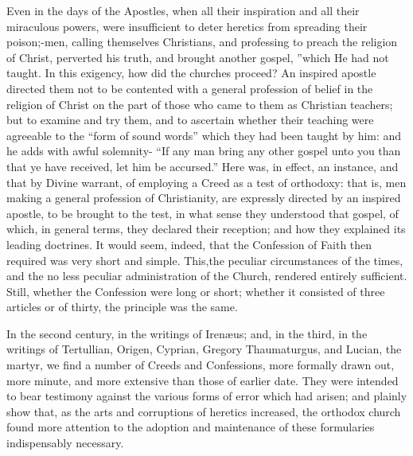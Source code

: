 \documentclass[
]{book}
\begin{document}
Even in the days of the Apostles, when all their inspiration and all their miraculous powers, were insufficient to deter heretics from spreading their poison;-men, calling themselves Christians, and professing to preach the religion of Christ, perverted his truth, and brought another gospel, ''which He had not taught. In this exigency, how did the churches proceed? An inspired apostle directed them not to be contented with a general profession of belief in the religion of Christ on the part of those who came to them as Christian teachers; but to examine and try them, and to ascertain whether their teaching were agreeable to the ``form of sound words'' which they had been taught by him: and he adds with awful solemnity- ``If any man bring any other gospel unto you than that ye have received, let him be accursed.'' Here was, in effect, an instance, and that by Divine warrant, of employing a Creed as a test of orthodoxy: that is, men making a general profession of Christianity, are expressly directed by an inspired apostle, to be brought to the test, in what sense they understood that gospel, of which, in general terms, they declared their reception; and how they explained its leading doctrines. It would seem, indeed, that the Confession of Faith then required was very short and simple. This,the peculiar circumstances of the times, and the no less peculiar administration of the Church, rendered entirely sufficient. Still, whether the Confession were long or short; whether it consisted of three articles or of thirty, the principle was the same.

In the second century, in the writings of Irenæus; and, in the third, in the writings of Tertullian, Origen, Cyprian, Gregory Thaumaturgus, and Lucian, the martyr, we find a number of Creeds and Confessions, more formally drawn out, more minute, and more extensive than those of earlier date. They were intended to bear testimony against the various forms of error which had arisen; and plainly show that, as the arts and corruptions of heretics increased, the orthodox church found more attention to the adoption and maintenance of these formularies indispensably necessary.
\end{document}
